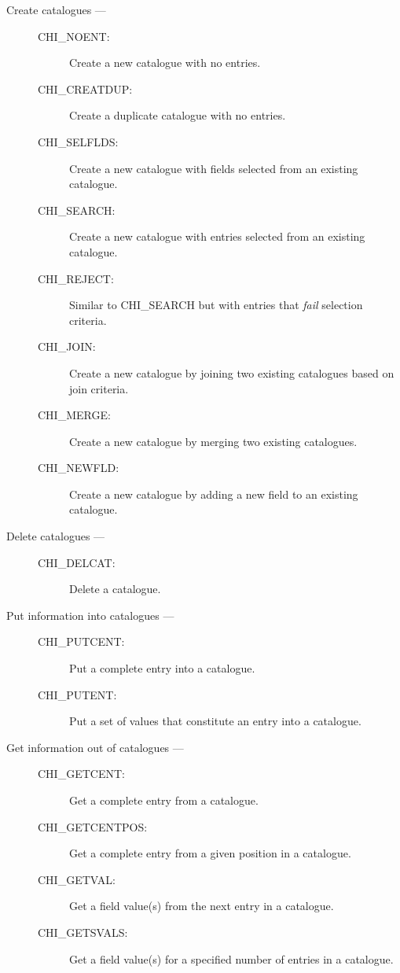 \begin{description}
\item [Create catalogues ---]

\begin{description}
\item [CHI\_NOENT:]  Create a new catalogue with no entries.
\item [CHI\_CREATDUP:]  Create a duplicate catalogue with no entries.
\item [CHI\_SELFLDS:]  Create a new catalogue with fields selected from an existing catalogue.
\item [CHI\_SEARCH:]  Create a new catalogue with entries selected from an existing catalogue.
\item [CHI\_REJECT:]  Similar to CHI\_SEARCH but with entries that {\em fail} selection criteria.
\item [CHI\_JOIN:]  Create a new catalogue by joining two existing catalogues based on join criteria.
\item [CHI\_MERGE:]  Create a new catalogue by merging two existing catalogues.
\item [CHI\_NEWFLD:]  Create a new catalogue by adding a new field to an existing catalogue.
\end{description}

\item [Delete catalogues ---]

\begin{description}
\item [CHI\_DELCAT:]  Delete a catalogue.
\end{description}

\item [Put information into catalogues ---]

\begin{description}
\item [CHI\_PUTCENT:]  Put a complete entry into a catalogue.
\item [CHI\_PUTENT:]   Put a set of values that constitute an entry into a catalogue.
\end{description}

\item [Get information out of catalogues ---]

\begin{description}
\item  [CHI\_GETCENT:]   Get a complete entry from a catalogue.
\item  [CHI\_GETCENTPOS:]  Get a complete entry from a given position in a catalogue.
\item  [CHI\_GETVAL:]  Get a field value(s) from the next entry in a catalogue.
\item  [CHI\_GETSVALS:]  Get a field value(s) for a specified number of entries in a catalogue.
\end{description}
\end{description}

